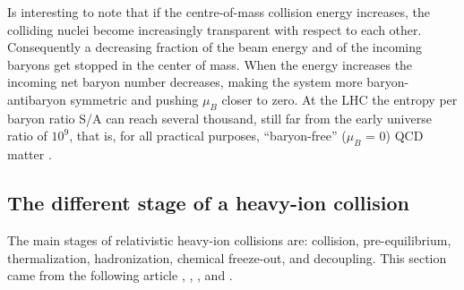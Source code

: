 \documentclass[12pt,a4paper]{book}
\begin{document}
	Is interesting to note that if the centre-of-mass collision energy increases, the colliding nuclei become increasingly transparent with respect to each other. Consequently a decreasing fraction of the beam energy and of the incoming baryons get stopped in the center of mass. When the energy increases the incoming net baryon number decreases, making the system more baryon-antibaryon symmetric and pushing $\mu_B$ closer to zero. At the LHC the entropy per baryon ratio S/A can reach several thousand, still far from the early universe ratio of $10^9$, that is, for all practical purposes, “baryon-free” ($\mu_B$ = 0) QCD matter
	\cite{heinz2004conceptsheavyionphysics}.
	
	\subsection{The different stage of a heavy-ion collision}
	The main stages of relativistic heavy-ion collisions are: collision, pre-equilibrium, thermalization, hadronization, chemical freeze-out, and	decoupling. This section came from the following article \cite{heinz2004conceptsheavyionphysics}, \cite{Herrmann:2920632}, \cite{Padhan:2924203}, \cite{Arata:2922803} and \cite{amsdottorato9036}.
\end{document}
